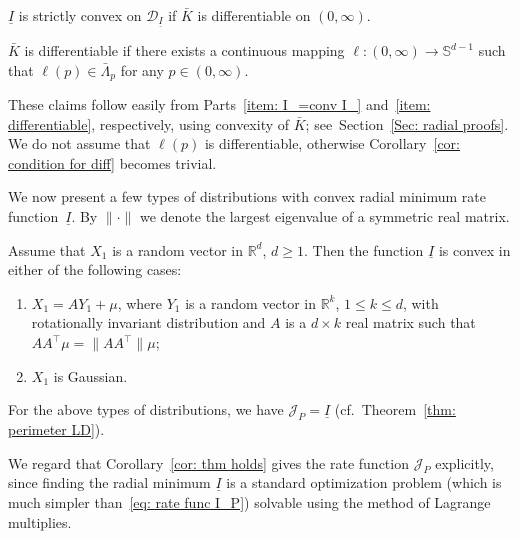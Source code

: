 \documentclass[AHL,Unicode,published]{cedram}
\newcommand{\ubar}[1]{\underline{#1}}
\newcommand{\Rbb}{\mathbb{R}}
\newcommand{\Sbb}{\mathbb{S}}
\newcommand{\Dcl}{\mathcal{D}}
\newcommand{\Jcl}{\mathcal{J}}
\newcommand*{\alphenumi}{\renewcommand*{\theenumi}{\alph{enumi}}}
\begin{document}
\begin{coro} \label{cor: L differentiable}
$\ubar I$ is strictly convex on $\Dcl_{\ubar I}$ if $\bar K$ is differentiable on $(0, \infty)$.
\end{coro}


\begin{coro} \label{cor: condition for diff}
$\bar K$ is differentiable if there exists a continuous mapping $\ell: (0, \infty) \to \Sbb^{d-1}$ such that $\ell(p) \in \bar \Lambda_p$ for any $p \in (0,\infty)$.
\end{coro}

These claims follow easily from Parts~\eqref{item: I_=conv I_} and~\eqref{item: differentiable}, respectively, using convexity of $\bar K$; see~Section~\ref{Sec: radial proofs}. We do not assume that $\ell(p)$ is differentiable, otherwise Corollary~\ref{cor: condition for diff} becomes trivial.

We now present a few types of distributions with convex radial minimum rate function~$\ubar I$. By $\| \cdot \|$ we denote the largest eigenvalue of a symmetric real matrix.

\begin{prop}\label{prop: conjecture holds}
Assume that $X_1$ is a random vector in $\Rbb^d$, $d \ge 1$. Then the function $\ubar I$ is convex in either of the following cases:
\begin{enumerate}\alphenumi
\item \label{item: pseudo-affine}
$X_1=A Y_1 + \mu$, where $Y_1$ is a random vector in $\Rbb^k$, $1 \le k \le d$, with rotationally invariant distribution and $A$ is a $d \times k$ real matrix such that $A A^\top \mu =\|A A^\top \! \| \mu$;

\item \label{item: Gaussian}
$X_1$ is Gaussian.
\end{enumerate}
\end{prop}


\begin{coro} \label{cor: thm holds}
For the above types of distributions, we have $\Jcl_P = \ubar I$ (cf.~Theorem~\ref{thm: perimeter LD}).
\end{coro}

We regard that Corollary~\ref{cor: thm holds} gives the rate function $\Jcl_P $ explicitly, since finding the radial minimum $\ubar I$ is a standard optimization problem (which is much simpler than~\eqref{eq: rate func I_P}) solvable using the method of Lagrange multiplies.
\end{document}

